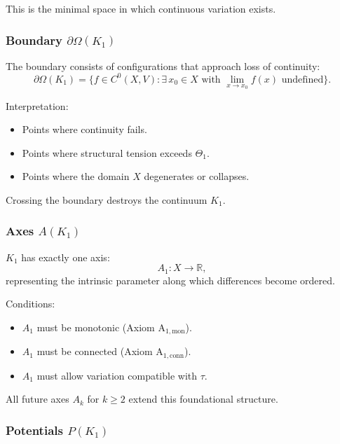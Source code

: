 This is the minimal space in which continuous variation exists.

\subsubsection{Boundary \texorpdfstring{$\partial\Omega(K_1)$}{\partial\Omega(K_1)}}

The boundary consists of configurations that approach loss of
continuity:
\[
\partial\Omega(K_1) =
\{ f \in C^0(X,V) : \exists\, x_0 \in X \text{ with }
\lim_{x \to x_0} f(x) \text{ undefined} \}.
\]

Interpretation:
\begin{itemize}
    \item Points where continuity fails.
    \item Points where structural tension exceeds $\Theta_1$.
    \item Points where the domain $X$ degenerates or collapses.
\end{itemize}

Crossing the boundary destroys the continuum $K_1$.

\subsubsection{Axes \texorpdfstring{$A(K_1)$}{A(K_1)}}

$K_1$ has exactly one axis:
\[
A_1 : X \to \mathbb{R},
\]
representing the intrinsic parameter along which differences become
ordered.

Conditions:
\begin{itemize}
    \item $A_1$ must be monotonic (Axiom A$_{1,\text{mon}}$).
    \item $A_1$ must be connected (Axiom A$_{1,\text{conn}}$).
    \item $A_1$ must allow variation compatible with $\tau$.
\end{itemize}

All future axes $A_k$ for $k \ge 2$ extend this foundational structure.

\subsubsection{Potentials \texorpdfstring{$P(K_1)$}{P(K_1)}}

